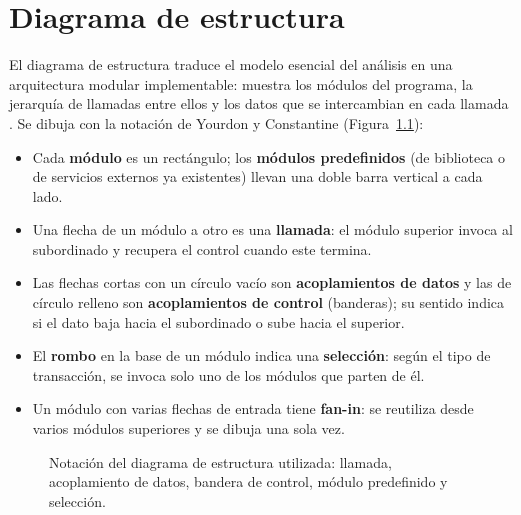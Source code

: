\chapter{Diagrama de estructura}
\label{cap:estructura}

El diagrama de estructura traduce el modelo esencial del análisis en una arquitectura
modular implementable: muestra los módulos del programa, la jerarquía de llamadas entre ellos
y los datos que se intercambian en cada llamada \parencite{yourdon1979, pagejones1988}. Se
dibuja con la notación de Yourdon y Constantine (Figura~\ref{fig:de-notacion}):

\begin{itemize}
    \item Cada \textbf{módulo} es un rectángulo; los \textbf{módulos predefinidos} (de
    biblioteca o de servicios externos ya existentes) llevan una doble barra vertical a cada
    lado.
    \item Una flecha de un módulo a otro es una \textbf{llamada}: el módulo superior invoca al
    subordinado y recupera el control cuando este termina.
    \item Las flechas cortas con un círculo vacío son \textbf{acoplamientos de datos} y las de
    círculo relleno son \textbf{acoplamientos de control} (banderas); su sentido indica si
    el dato baja hacia el subordinado o sube hacia el superior.
    \item El \textbf{rombo} en la base de un módulo indica una \textbf{selección}: según el tipo
    de transacción, se invoca solo uno de los módulos que parten de él.
    \item Un módulo con varias flechas de entrada tiene \textbf{fan-in}: se reutiliza desde
    varios módulos superiores y se dibuja una sola vez.
\end{itemize}

\begin{figure}[H]
    \centering
    \caption[Notación del diagrama de estructura]{Notación del diagrama de estructura
    utilizada: llamada, acoplamiento de datos, bandera de control, módulo predefinido y
    selección.}
    \label{fig:de-notacion}
\end{figure}

